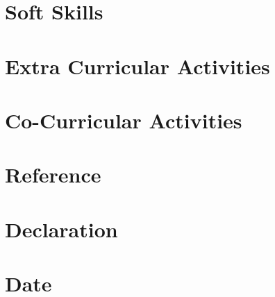 \documentclass[11pt]{article}
\begin{document}
\section{Soft Skills}
\section{Extra Curricular Activities}
\section{Co-Curricular Activities}
\section{Reference}
\section{Declaration}
\section{Date}
\end{document}
